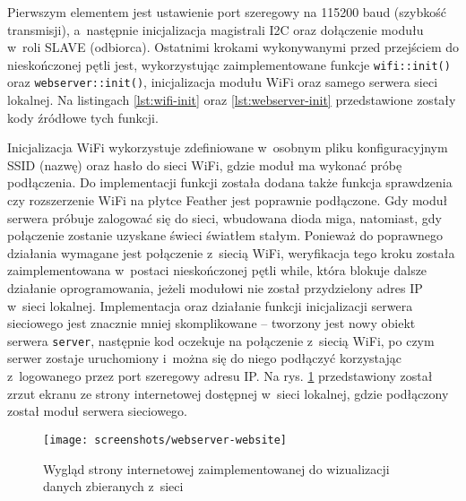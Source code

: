 Pierwszym elementem jest ustawienie port szeregowy na 115200 baud (szybkość transmisji), a~następnie inicjalizacja
magistrali I2C oraz dołączenie modułu w~roli SLAVE (odbiorca). Ostatnimi krokami wykonywanymi przed przejściem do
nieskończonej pętli jest, wykorzystując zaimplementowane funkcje \texttt{wifi::init()} oraz \texttt{webserver::init()},
inicjalizacja modułu WiFi oraz samego serwera sieci lokalnej. Na listingach \ref{lst:wifi-init} oraz
\ref{lst:webserver-init} przedstawione zostały kody źródłowe tych funkcji.





\FloatBarrier
Inicjalizacja WiFi wykorzystuje zdefiniowane w~osobnym pliku konfiguracyjnym SSID (nazwę) oraz hasło do sieci WiFi,
gdzie moduł ma wykonać próbę podłączenia. Do implementacji funkcji została dodana także funkcja sprawdzenia czy
rozszerzenie WiFi na płytce Feather jest poprawnie podłączone. Gdy moduł serwera próbuje zalogować się do sieci,
wbudowana dioda miga, natomiast, gdy połączenie zostanie uzyskane świeci światłem stałym. Ponieważ do poprawnego
działania wymagane jest połączenie z~siecią WiFi, weryfikacja tego kroku została zaimplementowana w~postaci
nieskończonej pętli while, która blokuje dalsze działanie oprogramowania, jeżeli modułowi nie został przydzielony adres
IP w~sieci lokalnej. Implementacja oraz działanie funkcji inicjalizacji serwera sieciowego jest znacznie mniej
skomplikowane -- tworzony jest nowy obiekt serwera \texttt{server}, następnie kod oczekuje na połączenie z~siecią WiFi,
po czym serwer zostaje uruchomiony i~można się do niego podłączyć korzystając z~logowanego przez port szeregowy adresu
IP. Na rys. \ref{img:webserver-website} przedstawiony został zrzut ekranu ze strony internetowej dostępnej w~sieci
lokalnej, gdzie podłączony został moduł serwera sieciowego.

\begin{figure}[!htbp]
    \centering
    \texttt{[image: screenshots/webserver-website]}
    \caption{\label{img:webserver-website}Wygląd strony internetowej zaimplementowanej do wizualizacji danych zbieranych
        z~sieci}
\end{figure}


